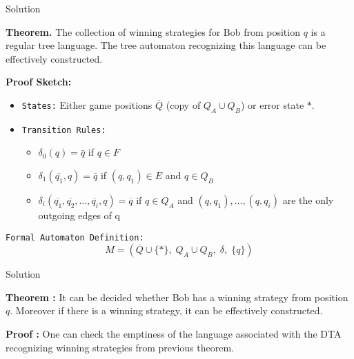 \documentclass[10pt,svgnames,fragile]{beamer}
\begin{document}
\begin{frame}{Solution}
\begin{tcolorbox}[colback=blue!5!white]
\textbf{Theorem.} The collection of winning strategies for Bob from position \( q \) is a regular tree language. The tree automaton recognizing this language can be effectively constructed.
\end{tcolorbox}

\pause
\vspace{2mm}

\textbf{Proof Sketch:}
\begin{itemize}
    \item \texttt{States:} Either game positions \( \overline{Q} \) (copy of \( Q_A \cup Q_B \)) or error state \( \ast \).
    \item \texttt{Transition Rules:}
    \begin{itemize}
        \item $\delta_0(q) = \bar{q}$ if $q\in F$
        \item $\delta_1(\bar{q_1},q) = \bar{q}$ if $(q,q_1)\in E$ and $q\in Q_B$
        \item $\delta_i(\overline{q_1}, \overline{q_2}, \dots, \overline{q_i}, q) = \overline{q}$ if $q \in Q_A $ and $ (q, q_1), \dots, (q, q_i)$ { are the only outgoing edges of } q
    \end{itemize}
\end{itemize}

\vspace{2mm}
\texttt{Formal Automaton Definition:}
\[
M = \left(\overline{Q} \cup \{\ast\},\; Q_A \cup Q_B,\; \delta,\; \{q\}\right)
\]
\end{frame}

\begin{frame}{Solution}
    \begin{block}{}
    \textbf{Theorem :} It can be decided whether Bob has a winning strategy from position $q$. Moreover if there is a winning strategy, it can be effectively constructed.
    \end{block}
    \pause 
    \begin{block}{}
    \textbf{Proof :} One can check the emptiness of the language associated with the DTA recognizing winning strategies from previous theorem.
    \end{block}
\end{frame}
\end{document}
